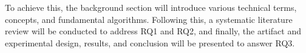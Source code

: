 To achieve this, the background section will introduce various 
technical terms, concepts, and fundamental algorithms. 
Following this, a systematic literature review will be conducted to address RQ1 and RQ2, 
and finally, the artifact and experimental design, results, and conclusion will 
be presented to answer RQ3.





